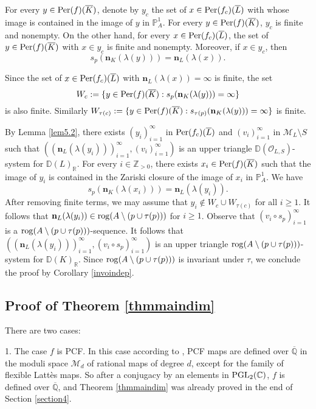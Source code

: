 \documentclass[12pt]{amsart}
\theoremstyle{plain}
\theoremstyle{remark}
\theoremstyle{definition}
\def\Z{\mathbb Z}
\def\Q{\mathbb Q}
\def\R{\mathbb R}
\def\C{\mathbb C}
\def\D{\mathbb D}
\def\P{\mathbb P}
\def\rog{{\rm rog}}
\def\PGL{{\rm PGL}}
\begin{document}
	For every $y\in{\rm Per}(f)(\overline{K})$, denote by $y_c$ the set of $x\in{\rm Per}(f_c)(\overline{L})$ with whose image is contained in the image of $y$ in $\P_A^1$. For every $y\in{\rm Per}(f)(\overline{K})$, $y_c$ is finite and nonempty. On the other hand, for every $x\in{\rm Per}(f_c)(\overline{L})$, the set of $y\in{\rm Per}(f)(\overline{K})$ with $x\in y_c$ is finite and nonempty. Moreover, if $x\in y_c$, then $$s_p(\mathbf{n}_K(\lambda(y)))=\mathbf{n}_L(\lambda(x)).$$\par 
	Since the set of $x\in{\rm Per}(f_c)(\overline{L})$ with $\mathbf{n}_L(\lambda(x))=\infty$ is finite, the set $$W_c:=\{y\in{\rm Per}(f)(\overline{K}):s_p(\mathbf{n}_K(\lambda(y)))=\infty\}$$ is also finite. Similarly $W_{\tau(c)}:=\{y\in{\rm Per}(f)(\overline{K}):s_{\tau(p)}(\mathbf{n}_K(\lambda(y)))=\infty\}$ is finite.\par 
	By Lemma \ref{lem5.2}, there exists $(y_{i})_{i=1}^\infty$ in ${\rm Per}(f_c)(\overline{L})$ and $(v_{i})_{i=1}^\infty$ in $\mathcal{M}_L \setminus S$ such that $((\mathbf{n}_{L}(\lambda(y_{i})))_{i=1}^\infty,(v_{i})_{i=1}^\infty)$ is an upper triangle $\D(\mathcal{O}_{L, S})$-system for $\D(L)_{\R}$. For every $i \in\Z_{>0}$, there exists $x_{i} \in {\rm Per}(f)(\overline{K})$ such that the image of $y_{i}$ is contained in the Zariski closure of the image of $x_{i}$ in $\P_{A}^{1}$. We have$$s_{p}(\mathbf{n}_{K}(\lambda(x_{i})))=\mathbf{n}_{L}(\lambda(y_{i})).$$After removing finite terms, we may assume that $y_{i} \notin W_{c} \cup W_{\tau(c)}$ for all $i \geq 1$. It follows that $\mathbf{n}_{L}(\lambda(y_{i})) \in \rog (A \setminus(p \cup \tau(p)))$ for $i \geq 1$. Observe that $(v_{i} \circ s_{p})_{i=1}^\infty$ is a $\rog (A \setminus(p \cup \tau(p)))$-sequence. It follows that $((\mathbf{n}_{L}(\lambda(y_{i})))_{i=1}^\infty,(v_{i} \circ s_{p})_{i=1}^\infty)$ is an upper triangle $\rog (A \setminus(p \cup \tau(p)))$-system for $\D(K)_{\R}$. Since $\rog (A \setminus(p \cup \tau(p)))$ is invariant under $\tau$, we conclude the proof by Corollary \ref{invoindep}.
	\subsection{Proof of Theorem  \ref{thmmaindim}}
	There are two cases: 
	\par 1. The case $f$ is PCF. In this case according to \cite{Douady1993},  PCF maps are defined over $\overline{\Q}$ in the moduli space $\mathcal{M}_d$ of rational maps of degree $d$, except for the family of flexible Latt\`es maps. So after a conjugacy by an elements in $\PGL_2(\C)$,  $f$ is defined over $\overline{\Q}$, and Theorem  \ref{thmmaindim} was already proved in the end of Section \ref{section4}.
\end{document}
